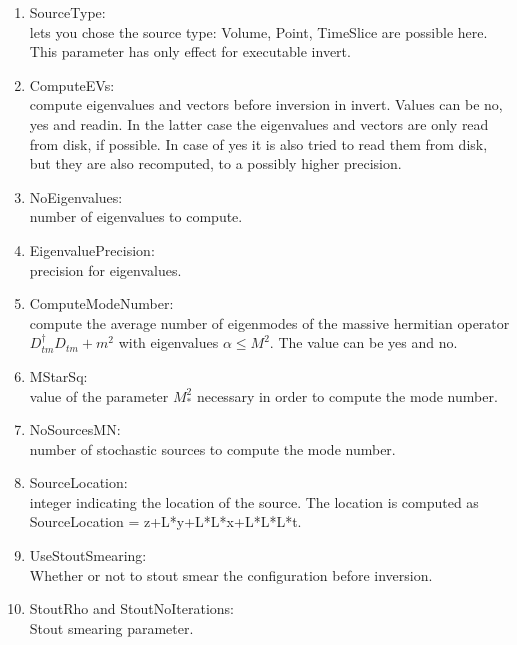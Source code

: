\begin{enumerate}
\item {\ttfamily SourceType}:\\
  lets you chose the source type: {\ttfamily Volume, Point, TimeSlice}
  are possible here. This parameter has only
  effect for executable {\ttfamily invert}.

\item {\ttfamily ComputeEVs}:\\
  compute eigenvalues and vectors before inversion in invert. Values
  can be no, yes and readin. In the latter case the eigenvalues and
  vectors are only read from disk, if possible. In case of yes it is
  also tried to read them from disk, but they are also recomputed, to
  a possibly higher precision.

\item {\ttfamily NoEigenvalues}:\\
  number of eigenvalues to compute.

\item {\ttfamily EigenvaluePrecision}:\\
  precision for eigenvalues.

\item {\ttfamily ComputeModeNumber}:\\
  compute the average number of eigenmodes of the massive hermitian
  operator $D_{tm}^{\dagger}D_{tm}+m^2$ with eigenvalues
  $\alpha\leq M^2$. The value can be
  yes and no.

\item {\ttfamily MStarSq}:\\
  value of the parameter $M_*^2$ necessary in order to compute the
  mode number.

\item {\ttfamily NoSourcesMN}:\\
  number of stochastic sources to compute the mode number.

\item {\ttfamily SourceLocation}:\\
  integer indicating the location of the source. The location is computed as
  {\ttfamily SourceLocation = z+L*y+L*L*x+L*L*L*t}.

\item {\ttfamily UseStoutSmearing}:\\
  Whether or not to stout smear the configuration before inversion.

\item {\ttfamily StoutRho} and {\ttfamily StoutNoIterations}:\\
  Stout smearing parameter.


\end{enumerate}

